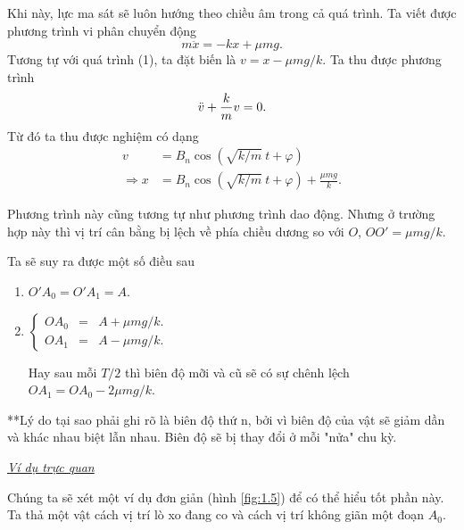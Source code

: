 \documentclass[12pt]{article}
\begin{document}
Khi này, lực ma sát sẽ luôn hướng theo chiều âm trong cả quá trình. Ta viết được phương trình vi phân chuyển động
\begin{equation}
    m \ddot{x} =  - kx + \mu m g.
    \label{eq:1.6}
\end{equation}
Tương tự với quá trình (1), ta đặt biến là $v = x - \mu mg/k$. Ta thu được phương trình
\begin{equation*}
    \ddot{v} + {\frac{k}{m} \displaystyle} v = 0.
\end{equation*}
Từ đó ta thu được nghiệm có dạng
\begin{equation}
    \begin{split}
        v &= B_n \cos{\left(\sqrt{k/m} \ t + \varphi \right)} \\
        \Rightarrow x &=  B_n \cos{\left(\sqrt{k/m} \ t + \varphi \right)} + {\displaystyle \frac{\mu m g}{k}}.
    \end{split}
    \label{eq:1.7}
\end{equation}

Phương trình này cũng tương tự như phương trình dao động. Nhưng ở trường hợp này thì vị trí cân bằng bị lệch về phía chiều dương so với $O$, $OO' = \mu mg/k$. 

\begin{figure}[!htb]
    \centering
    
    \caption{}
    \label{fig:1.4}
\end{figure}

Ta sẽ suy ra được một số điều sau
\begin{enumerate}
    \item \(O'A_0 = O'A_1 = A\).
    \item 
    \(
    \left\{
        \begin{array}{ccc}
        OA_0 &=& A + \mu mg/k. \\ 
        OA_1 &=& A - \mu mg/k.
        \end{array}
    \right.
    \) 

    Hay sau mỗi \(T/2\) thì biên độ mỡi và cũ sẽ có sự chênh lệch
    \(OA_1 = OA_0 - 2 \mu mg/k\).
\end{enumerate}

**Lý do tại sao phải ghi rõ là biên độ thứ n, bởi vì biên độ của vật sẽ giảm dần và khác nhau biệt lẫn nhau. Biên độ sẽ bị thay đổi ở mỗi "nửa" chu kỳ. 
\vspace{2mm}

\underline{\textit{Ví dụ trực quan}}

Chúng ta sẽ xét một ví dụ đơn giản (hình \ref{fig:1.5}) để có thể hiểu tốt phần này. Ta thả một vật cách vị trí lò xo đang co và cách vị trí không giãn một đoạn $A_0$.
\vspace{2mm}
\end{document}
